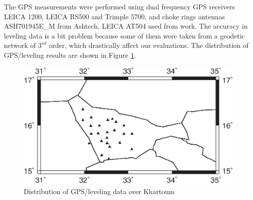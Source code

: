 The GPS measurements were performed using dual frequency GPS receivers LEICA 1200, LEICA RS500 and Trimple 5700, and choke rings antennas ASH701945E\_M from Ashtech, LEICA AT504  used from \citet{ahmed_msc} work. The accuracy in leveling data is a bit problem because some of them were taken from a geodetic network of $3^{rd}$ order, which drastically affect our evaluations. The distribution of GPS/leveling results are shown in Figure \ref{fig:gps_khartoum}.

\begin{figure}[t]
	\caption{Distribution of GPS/leveling data over Khartoum}
	\label{fig:gps_khartoum}
	\includegraphics{Figures/points_dist_krt}
	\centering
\end{figure}


